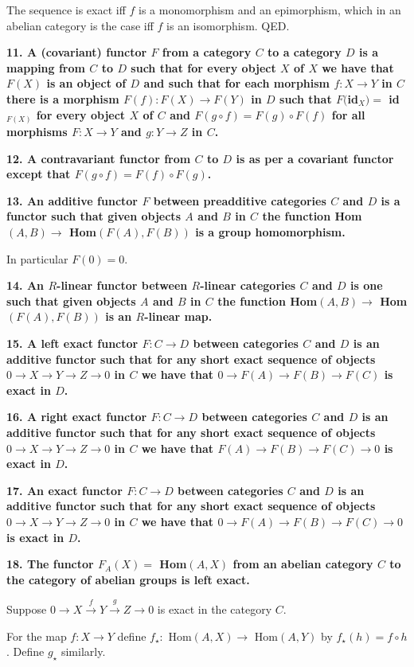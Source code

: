 \documentclass[12pt]{article}
\begin{document}
The sequence is exact iff $f$ is a monomorphism and an epimorphism, which in an abelian category is the case iff $f$ is an isomorphism. QED.

\textbf{11. A (covariant) functor $F$ from a category $C$ to a category $D$ is a mapping from $C$ to $D$ such that for every object $X$ of $X$ we have that $F(X)$ is an object of $D$ and such that for each morphism $f : X \to Y$ in $C$ there is a morphism $F(f) : F(X) \to F(Y)$ in $D$ such that $F($id$_X) =$ id$_{F(X)}$ for every object $X$ of $C$ and $F(g\circ f) = F(g)\circ F(f)$ for all morphisms $F : X \to Y$ and $g : Y \to Z$ in $C$.}

\textbf{12. A contravariant functor from $C$ to $D$ is as per a covariant functor except that $F(g\circ f) = F(f)\circ F(g)$.}

\textbf{13. An additive functor $F$ between preadditive categories $C$ and $D$ is a functor such that given objects $A$ and $B$ in $C$ the function Hom$(A, B) \to$ Hom$(F(A), F(B))$ is a group homomorphism.}

In particular $F(0) = 0$.

\textbf{14. An $R$-linear functor between $R$-linear categories $C$ and $D$ is one such that given objects $A$ and $B$ in $C$ the function Hom$(A, B) \to$ Hom$(F(A), F(B))$ is an $R$-linear map.}

\textbf{15. A left exact functor $F : C \to D$ between categories $C$ and $D$ is an additive functor such that for any short exact sequence of objects $0 \to X \to Y \to Z \to 0$ in $C$ we have that $0 \to F(A) \to F(B) \to F(C)$ is exact in $D$.}

\textbf{16. A right exact functor $F : C \to D$ between categories $C$ and $D$ is an additive functor such that for any short exact sequence of objects $0 \to X \to Y \to Z \to 0$ in $C$ we have that $F(A) \to F(B) \to F(C) \to 0$ is exact in $D$.}

\textbf{17. An exact functor $F : C \to D$ between categories $C$ and $D$ is an additive functor such that for any short exact sequence of objects $0 \to X \to Y \to Z \to 0$ in $C$ we have that $0 \to F(A) \to F(B) \to F(C) \to 0$ is exact in $D$.}

\textbf{18. The functor $F_A(X) =$ Hom$(A, X)$ from an abelian category $C$ to the category of abelian groups is left exact.}

Suppose $0 \rightarrow X \overset{f}{\rightarrow} Y \overset{g}{\rightarrow} Z \to 0$ is exact in the category $C$.

For the map $f : X \to Y$ define $f_{\star} :$ Hom$(A, X) \to$ Hom$(A, Y)$ by $f_{\star}(h) = f\circ h$. Define $g_{\star}$ similarly.
\end{document}
